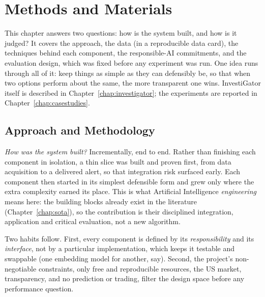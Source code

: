 
\chapter{Methods and Materials}
\label{chap:methods}

This chapter answers two questions: how is the system built, and how is it judged? It covers the approach,
the data (in a reproducible data card), the techniques behind each component, the responsible-AI
commitments, and the evaluation design, which was fixed before any experiment was run. One idea runs
through all of it: keep things as simple as they can defensibly be, so that when two options perform about
the same, the more transparent one wins. InvestiGator itself is described in Chapter~\ref{chap:investigator}; the
experiments are reported in Chapter~\ref{chap:casestudies}.

\section{Approach and Methodology}
\label{sec:met_approach}

\emph{How was the system built?} Incrementally, end to end. Rather than finishing each component in
isolation, a thin slice was built and proven first, from data acquisition to a delivered alert, so that
integration risk surfaced early. Each component then started in its simplest defensible form and grew only
where the extra complexity earned its place. This is what Artificial Intelligence \emph{engineering} means
here: the building blocks already exist in the literature (Chapter~\ref{chap:sota}), so the contribution is
their disciplined integration, application and critical evaluation, not a new algorithm.

Two habits follow. First, every component is defined by its \emph{responsibility} and its \emph{interface},
not by a particular implementation, which keeps it testable and swappable (one embedding model for another,
say). Second, the project's non-negotiable constraints, only free and reproducible resources, the US
market, transparency, and no prediction or trading, filter the design space before any performance
question.

